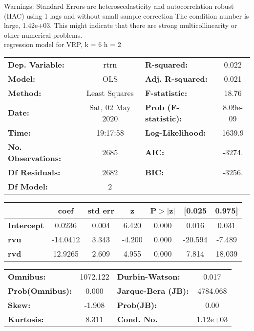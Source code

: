 Warnings: \newline
 [1] Standard Errors are heteroscedasticity and autocorrelation robust (HAC) using 1 lags and without small sample correction \newline
 [2] The condition number is large, 1.42e+03. This might indicate that there are \newline
 strong multicollinearity or other numerical problems.\\ 

regression model for VRP, k = 6 h = 2\begin{center}
\begin{tabular}{lclc}
\toprule
\textbf{Dep. Variable:}    &       rtrn       & \textbf{  R-squared:         } &     0.022   \\
\textbf{Model:}            &       OLS        & \textbf{  Adj. R-squared:    } &     0.021   \\
\textbf{Method:}           &  Least Squares   & \textbf{  F-statistic:       } &     18.76   \\
\textbf{Date:}             & Sat, 02 May 2020 & \textbf{  Prob (F-statistic):} &  8.09e-09   \\
\textbf{Time:}             &     19:17:58     & \textbf{  Log-Likelihood:    } &    1639.9   \\
\textbf{No. Observations:} &        2685      & \textbf{  AIC:               } &    -3274.   \\
\textbf{Df Residuals:}     &        2682      & \textbf{  BIC:               } &    -3256.   \\
\textbf{Df Model:}         &           2      & \textbf{                     } &             \\
\bottomrule
\end{tabular}
\begin{tabular}{lcccccc}
                   & \textbf{coef} & \textbf{std err} & \textbf{z} & \textbf{P$> |$z$|$} & \textbf{[0.025} & \textbf{0.975]}  \\
\midrule
\textbf{Intercept} &       0.0236  &        0.004     &     6.420  &         0.000        &        0.016    &        0.031     \\
\textbf{rvu}       &     -14.0412  &        3.343     &    -4.200  &         0.000        &      -20.594    &       -7.489     \\
\textbf{rvd}       &      12.9265  &        2.609     &     4.955  &         0.000        &        7.814    &       18.039     \\
\bottomrule
\end{tabular}
\begin{tabular}{lclc}
\textbf{Omnibus:}       & 1072.122 & \textbf{  Durbin-Watson:     } &    0.017  \\
\textbf{Prob(Omnibus):} &   0.000  & \textbf{  Jarque-Bera (JB):  } & 4784.068  \\
\textbf{Skew:}          &  -1.908  & \textbf{  Prob(JB):          } &     0.00  \\
\textbf{Kurtosis:}      &   8.311  & \textbf{  Cond. No.          } & 1.12e+03  \\
\bottomrule
\end{tabular}
\end{center}

